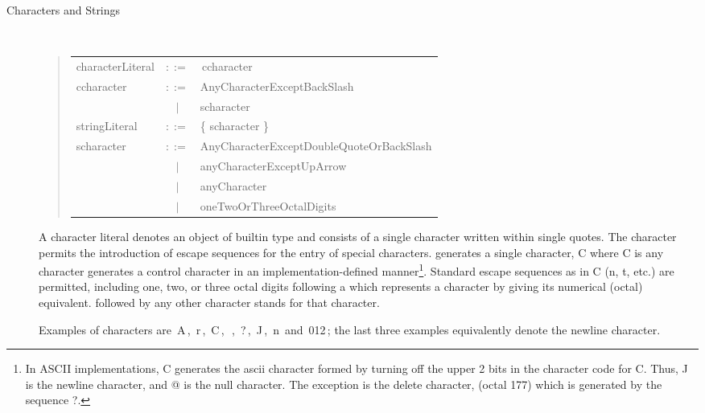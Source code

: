 \begin{description}
\item[Characters and Strings]~\\
\label{character literals}
\newcommand{\charlit}[1]{\terminal{'}\,#1\,\terminal{'}}

\begin{quote}\it\begin{tabular}{lcl}
characterLiteral &$::=$& \charlit{ccharacter} \\[1ex]
ccharacter & $::=$&	AnyCharacterExceptBackSlash  \\
& $|$ & scharacter\\[1ex]
stringLiteral &$::=$& \terminal{"} \{ scharacter \} \terminal{"}\\[1ex]
scharacter & $::=$&	AnyCharacterExceptDoubleQuoteOrBackSlash  \\
& $|$ & \terminal{\mybackslash} anyCharacterExceptUpArrow   \\
& $|$ & \terminal{\mybackslash}\terminal{\myuparrow}anyCharacter \\
& $|$ & \terminal{\mybackslash}oneTwoOrThreeOctalDigits
\end{tabular}\end{quote}
A character literal denotes an object of builtin type  and
consists of a single character written within single quotes.
The character \mybackslash{} permits the introduction of
escape sequences for the entry of special characters.
\mybackslash\mybackslash{} generates a single \mybackslash{} character,
\mybackslash\myuparrow{}C where C is any character
generates a control character in an implementation-defined 
manner\footnote{
In ASCII implementations, \mybackslash\myuparrow{}C
generates the ascii character formed by turning off the upper 2 bits 
in the character code for C.  Thus, \mybackslash\myuparrow{}J
is the newline character, and \mybackslash\myuparrow{}@ is the
null character.  The exception is the delete character, (octal 177) which is
generated by the sequence \mybackslash\myuparrow{}?.}.  Standard escape
sequences as in C (\mybackslash{}n, \mybackslash{}t,
etc.) are permitted, including one, two, or three octal digits
following a \mybackslash{} which represents a character by giving
its numerical (octal) equivalent.
\terminal{\mybackslash} followed by any other character stands for that
character.

Examples of characters are \charlit{A}, \charlit{r},
\charlit{\mybackslash\myuparrow{}C},  
\charlit{\mybackslash\mybackslash}, 
\charlit{\mybackslash\myuparrow{}?},
\charlit{\mybackslash\myuparrow{}J}, \charlit{\mybackslash{}n} and
\charlit{\mybackslash{}012};
the last three examples equivalently denote the newline character.


\end{description}
